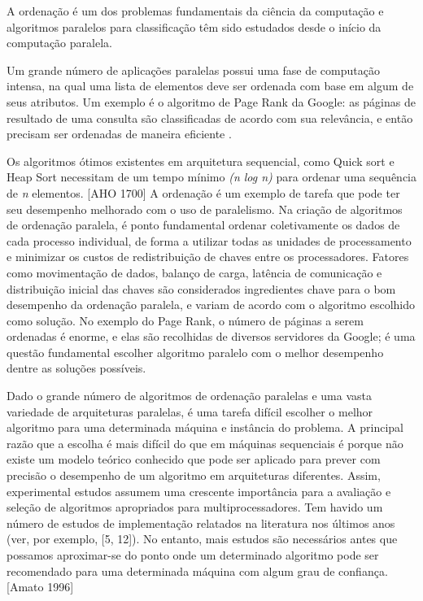 A ordenação é um dos problemas fundamentais da ciência da computação e algoritmos paralelos para classificação têm sido estudados desde o início da computação paralela.

Um grande número de aplicações paralelas possui uma fase de computação intensa, na qual uma lista de elementos deve ser ordenada com base em algum de seus atributos. Um exemplo é o algoritmo de Page Rank \cite{Page:1999} da Google: as páginas de resultado de uma consulta são classificadas de acordo com sua relevância, e então precisam ser ordenadas de maneira eficiente \cite{Kale:2010}.


Os algoritmos ótimos existentes em arquitetura sequencial, como Quick sort e Heap Sort necessitam de um tempo mínimo \textit{(n log n)} para ordenar uma sequência de \textit{n} elementos.  [AHO 1700] 
A ordenação é um exemplo de tarefa que pode ter seu desempenho melhorado com o uso de paralelismo. Na criação de algoritmos de ordenação paralela, é ponto fundamental ordenar coletivamente os dados de cada processo individual, de forma a utilizar todas as unidades de processamento e minimizar os custos de redistribuição de chaves entre os processadores. Fatores como movimentação de dados, balanço de carga, latência de comunicação e distribuição inicial das chaves são considerados ingredientes chave para o bom desempenho da ordenação paralela, e variam de acordo com o algoritmo escolhido como solução\cite{Kale:2010}. 
No exemplo do Page Rank, o número de páginas a serem ordenadas é enorme, e elas são recolhidas de diversos servidores da Google; é uma questão fundamental escolher algoritmo paralelo com o melhor desempenho dentre as soluções possíveis.

Dado o grande número de algoritmos de ordenação paralelas e uma vasta variedade de arquiteturas paralelas, é uma tarefa difícil escolher o melhor algoritmo para uma determinada máquina e instância do problema. A principal razão que a escolha é mais difícil do que em máquinas sequenciais é porque não existe um modelo teórico conhecido que pode ser aplicado para prever com precisão o desempenho de um algoritmo em arquiteturas diferentes. Assim, experimental estudos assumem uma crescente importância para a avaliação e seleção de algoritmos apropriados para multiprocessadores. Tem havido um número de estudos de implementação relatados na literatura nos últimos anos (ver, por exemplo, [5, 12]). No entanto, mais estudos são necessários antes que possamos aproximar-se do ponto onde um determinado algoritmo pode ser recomendado para uma determinada máquina com algum grau de confiança.
[Amato 1996]

